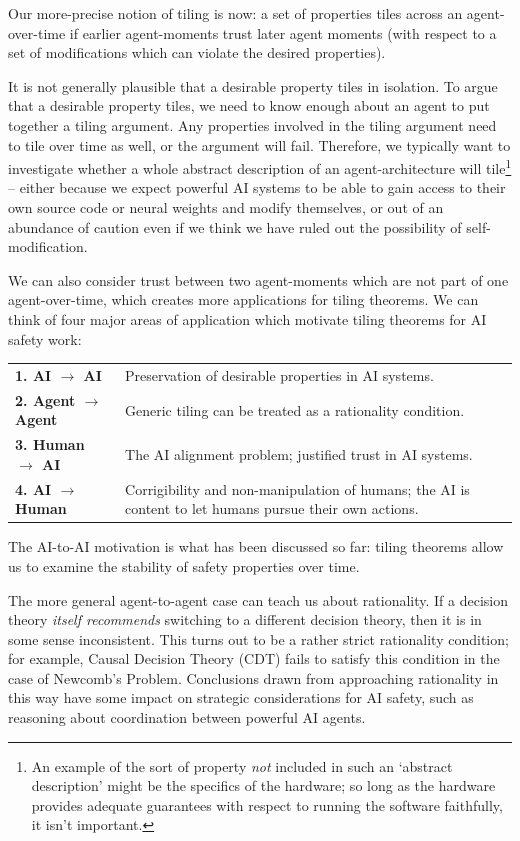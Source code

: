 \documentclass{article}
\begin{document}
Our more-precise notion of tiling is now: a set of properties tiles across an agent-over-time if earlier agent-moments trust later agent moments (with respect to a set of modifications which can violate the desired properties).

It is not generally plausible that a desirable property tiles in isolation. To argue that a desirable property tiles, we need to know enough about an agent to put together a tiling argument. Any properties involved in the tiling argument need to tile over time as well, or the argument will fail. Therefore, we typically want to investigate whether a whole abstract description of an agent-architecture will tile\footnote{An example of the sort of property \emph{not} included in such an `abstract description' might be the specifics of the hardware; so long as the hardware provides adequate guarantees with respect to running the software faithfully, it isn't important.}  -- either because we expect powerful AI systems to be able to gain access to their own source code or neural weights and modify themselves, or out of an abundance of caution even if we think we have ruled out the possibility of self-modification. 

We can also consider trust between two agent-moments which are not part of one agent-over-time, which creates more applications for tiling theorems. We can think of four major areas of application which motivate tiling theorems for AI safety work:

\begin{tabularx}{\textwidth}{l X}
    \textbf{1. AI $\to$ AI} & Preservation of desirable properties in AI systems. \\
    \textbf{2. Agent $\to$ Agent} & Generic tiling can be treated as a rationality condition. \\
    \textbf{3. Human $\to$ AI} & The AI alignment problem; justified trust in AI systems. \\
    \textbf{4. AI $\to$ Human} & Corrigibility \cite{Soares2015Corrigibility} and non-manipulation of humans; the AI is content to let humans pursue their own actions.
\end{tabularx}

The AI-to-AI motivation is what has been discussed so far: tiling theorems allow us to examine the stability of safety properties over time.

The more general agent-to-agent case can teach us about rationality. If a decision theory \emph{itself recommends} switching to a different decision theory, then it is in some sense inconsistent. This turns out to be a rather strict rationality condition; for example, Causal Decision Theory (CDT) fails to satisfy this condition in the case of Newcomb's Problem. Conclusions drawn from approaching rationality in this way have some impact on strategic considerations for AI safety, such as reasoning about coordination between powerful AI agents.
\end{document}
